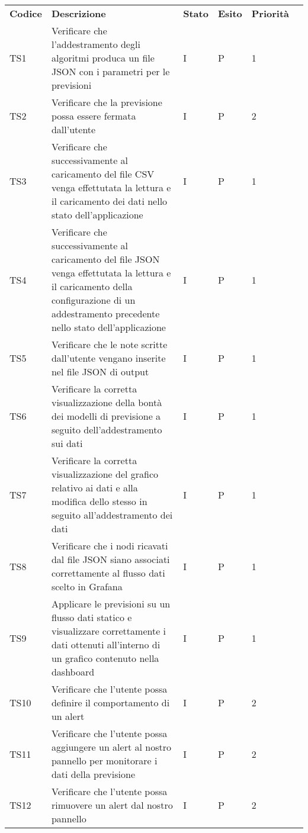 \begin{longtable} {
	>{}p{12mm}
	>{}p{79.5mm}
	>{}p{9mm}
	>{}p{8mm}
	>{}p{14mm}
	>{}p{0mm}}
	\rowcolor{gray!50}
	\textbf{Codice} & \textbf{Descrizione} & \textbf{Stato} & \textbf{Esito} & \textbf{Priorità} & \TBstrut \\
	TS1 & Verificare che l'addestramento degli algoritmi produca un file JSON con i parametri per le previsioni & I & P & 1 & \TBstrut \\ [2mm]
	TS2 & Verificare che la previsione possa essere fermata dall'utente & I & P & 2 & \TBstrut \\ [2mm]
	TS3 & Verificare che successivamente al caricamento del file CSV venga effettutata la lettura e il caricamento dei dati nello stato dell'applicazione & I & P & 1 & \TBstrut \\ [2mm]
	TS4 & Verificare che successivamente al caricamento del file JSON venga effettutata la lettura e il caricamento della configurazione di un addestramento precedente nello stato dell'applicazione & I & P & 1 & \TBstrut \\ [2mm]
	TS5 & Verificare che le note scritte dall'utente vengano inserite nel file JSON di output & I & P & 1 & \TBstrut \\ [2mm]
	TS6 & Verificare la corretta visualizzazione della bontà dei modelli di previsione a seguito dell'addestramento sui dati & I & P & 1 & \TBstrut \\ [2mm]
	TS7 & Verificare la corretta visualizzazione del grafico relativo ai dati e alla modifica dello stesso in seguito all'addestramento dei dati & I & P & 1 & \TBstrut \\ [2mm]
	TS8 & Verificare che i nodi ricavati dal file JSON siano associati correttamente al flusso dati scelto in Grafana\glo & I & P & 1 & \TBstrut \\ [2mm]
	TS9 & Applicare le previsioni su un flusso dati statico e visualizzare correttamente i dati ottenuti all'interno di un grafico contenuto nella dashboard\glo & I & P & 1 & \TBstrut \\ [2mm]
	TS10 & Verificare che l'utente possa definire il comportamento di un alert & I & P & 2 & \TBstrut \\ [2mm]
	TS11 & Verificare che l'utente possa aggiungere un alert al nostro pannello per monitorare i dati della previsione & I & P & 2 & \TBstrut \\ [2mm]
	TS12 & Verificare che l'utente possa rimuovere un alert dal nostro pannello & I & P & 2 & \TBstrut \\ [2mm]

\end{longtable}
